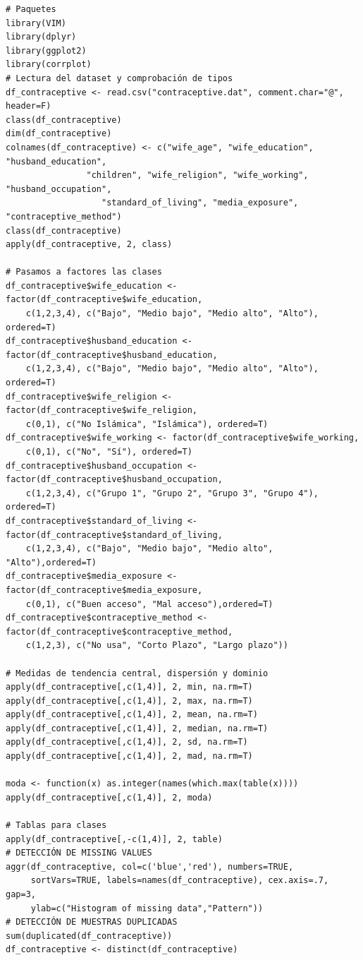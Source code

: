 \documentclass[a4paper,12pt, oneside]{book}
\begin{document}
\begin{verbatim}
# Paquetes
library(VIM)
library(dplyr)
library(ggplot2)
library(corrplot)
# Lectura del dataset y comprobación de tipos
df_contraceptive <- read.csv("contraceptive.dat", comment.char="@", header=F)
class(df_contraceptive)
dim(df_contraceptive)
colnames(df_contraceptive) <- c("wife_age", "wife_education", "husband_education", 
	            "children", "wife_religion", "wife_working", "husband_occupation",
                   "standard_of_living", "media_exposure", "contraceptive_method")
class(df_contraceptive)
apply(df_contraceptive, 2, class)

# Pasamos a factores las clases
df_contraceptive$wife_education <- factor(df_contraceptive$wife_education, 
	c(1,2,3,4), c("Bajo", "Medio bajo", "Medio alto", "Alto"), ordered=T)
df_contraceptive$husband_education <- factor(df_contraceptive$husband_education,
    c(1,2,3,4), c("Bajo", "Medio bajo", "Medio alto", "Alto"), ordered=T)
df_contraceptive$wife_religion <- factor(df_contraceptive$wife_religion, 
	c(0,1), c("No Islámica", "Islámica"), ordered=T)
df_contraceptive$wife_working <- factor(df_contraceptive$wife_working, 
	c(0,1), c("No", "Sí"), ordered=T)
df_contraceptive$husband_occupation <- factor(df_contraceptive$husband_occupation, 
	c(1,2,3,4), c("Grupo 1", "Grupo 2", "Grupo 3", "Grupo 4"), ordered=T)
df_contraceptive$standard_of_living <- factor(df_contraceptive$standard_of_living, 
	c(1,2,3,4), c("Bajo", "Medio bajo", "Medio alto", "Alto"),ordered=T)
df_contraceptive$media_exposure <- factor(df_contraceptive$media_exposure, 
	c(0,1), c("Buen acceso", "Mal acceso"),ordered=T)
df_contraceptive$contraceptive_method <- factor(df_contraceptive$contraceptive_method, 
	c(1,2,3), c("No usa", "Corto Plazo", "Largo plazo"))

# Medidas de tendencia central, dispersión y dominio
apply(df_contraceptive[,c(1,4)], 2, min, na.rm=T)
apply(df_contraceptive[,c(1,4)], 2, max, na.rm=T)
apply(df_contraceptive[,c(1,4)], 2, mean, na.rm=T)
apply(df_contraceptive[,c(1,4)], 2, median, na.rm=T)
apply(df_contraceptive[,c(1,4)], 2, sd, na.rm=T)
apply(df_contraceptive[,c(1,4)], 2, mad, na.rm=T)

moda <- function(x) as.integer(names(which.max(table(x))))
apply(df_contraceptive[,c(1,4)], 2, moda)

# Tablas para clases
apply(df_contraceptive[,-c(1,4)], 2, table)
# DETECCIÓN DE MISSING VALUES
aggr(df_contraceptive, col=c('blue','red'), numbers=TRUE,
     sortVars=TRUE, labels=names(df_contraceptive), cex.axis=.7, gap=3,
     ylab=c("Histogram of missing data","Pattern"))
# DETECCIÓN DE MUESTRAS DUPLICADAS
sum(duplicated(df_contraceptive))
df_contraceptive <- distinct(df_contraceptive)


\end{verbatim}
\end{document}
